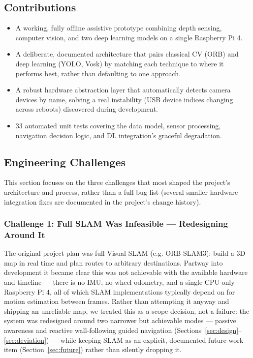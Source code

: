 \documentclass[12pt,a4paper]{article}
\begin{document}
\subsection{Contributions}
\begin{itemize}[leftmargin=1.4cm]
  \item A working, fully offline assistive prototype combining depth sensing, computer vision, and two deep learning models on a single Raspberry Pi 4.
  \item A deliberate, documented architecture that pairs classical CV (ORB) and deep learning (YOLO, Vosk) by matching each technique to where it performs best, rather than defaulting to one approach.
  \item A robust hardware abstraction layer that automatically detects camera devices by name, solving a real instability (USB device indices changing across reboots) discovered during development.
  \item 33 automated unit tests covering the data model, sensor processing, navigation decision logic, and DL integration's graceful degradation.
\end{itemize}

\subsection{Engineering Challenges}
This section focuses on the three challenges that most shaped the project's architecture and process, rather than a full bug list (several smaller hardware integration fixes are documented in the project's change history).

\subsubsection{Challenge 1: Full SLAM Was Infeasible — Redesigning Around It}
The original project plan was full Visual SLAM (e.g. ORB-SLAM3): build a 3D map in real time and plan routes to arbitrary destinations. Partway into development it became clear this was not achievable with the available hardware and timeline — there is no IMU, no wheel odometry, and a single CPU-only Raspberry Pi 4, all of which SLAM implementations typically depend on for motion estimation between frames. Rather than attempting it anyway and shipping an unreliable map, we treated this as a scope decision, not a failure: the system was redesigned around two narrower but achievable modes — passive awareness and reactive wall-following guided navigation (Sections~\ref{sec:design}--\ref{sec:deviation}) — while keeping SLAM as an explicit, documented future-work item (Section~\ref{sec:future}) rather than silently dropping it.
\end{document}
